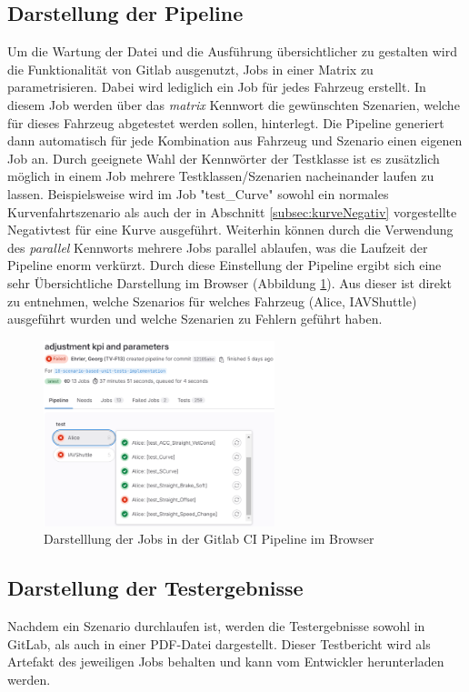 \subsection{Darstellung der Pipeline}
Um die Wartung der Datei und die Ausführung übersichtlicher zu gestalten wird die Funktionalität von Gitlab ausgenutzt, Jobs in einer Matrix zu parametrisieren. Dabei wird lediglich ein Job für jedes Fahrzeug erstellt. In diesem Job werden über das \textit{matrix} Kennwort die gewünschten Szenarien, welche für dieses Fahrzeug abgetestet werden sollen, hinterlegt. Die Pipeline generiert dann automatisch für jede Kombination aus Fahrzeug und Szenario einen eigenen Job an. Durch geeignete Wahl der Kennwörter der Testklasse ist es zusätzlich möglich in einem Job mehrere Testklassen/Szenarien nacheinander laufen zu lassen. Beispielsweise wird im Job "test\_Curve" sowohl ein normales Kurvenfahrtszenario als auch der in Abschnitt \ref{subsec:kurveNegativ} vorgestellte Negativtest für eine Kurve ausgeführt. Weiterhin können durch die Verwendung des \textit{parallel} Kennworts mehrere Jobs parallel ablaufen, was die Laufzeit der Pipeline enorm verkürzt. Durch diese Einstellung der Pipeline ergibt sich eine sehr Übersichtliche Darstellung im Browser (Abbildung \ref{fig:uebersicht_pipeline}). Aus dieser ist direkt zu entnehmen, welche Szenarios für welches Fahrzeug (Alice, IAVShuttle) ausgeführt wurden und welche Szenarien zu Fehlern geführt haben.
\begin{figure}
    \centering
    \includegraphics[width=0.6\textwidth]{figures/3_Implementierung/uebersicht_pipeline.png}
    \caption{Darstelllung der Jobs in der Gitlab CI Pipeline im Browser}
    \label{fig:uebersicht_pipeline}
\end{figure}

\subsection{Darstellung der Testergebnisse}
Nachdem ein Szenario durchlaufen ist, werden die Testergebnisse sowohl in GitLab, als auch in einer PDF-Datei dargestellt. Dieser Testbericht wird als Artefakt des jeweiligen Jobs behalten und kann vom Entwickler herunterladen werden.

